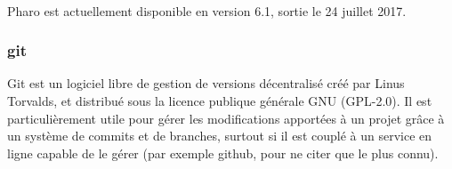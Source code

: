 	\paragraph{}
	Pharo est actuellement disponible en version 6.1, sortie le 24 juillet 2017.

	\subsubsection{git}
	Git est un logiciel libre de gestion de versions décentralisé créé par Linus Torvalds, et distribué sous la licence publique générale GNU (GPL-2.0). Il est particulièrement utile pour gérer les modifications apportées à un projet grâce à un système de commits et de branches, surtout si il est couplé à un service en ligne capable de le gérer (par exemple github, pour ne citer que le plus connu).
